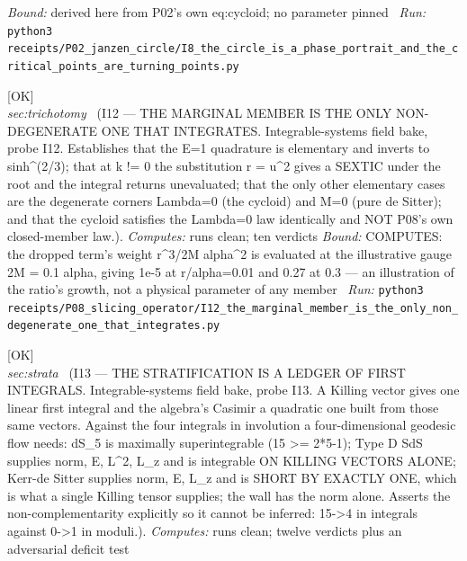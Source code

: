 \begin{description}
 \emph{Bound:} derived here from P02's own eq:cycloid; no parameter pinned
\ \emph{Run:} \texttt{python3 receipts/P02\_janzen\_circle/I8\_the\_circle\_is\_a\_phase\_portrait\_and\_the\_critical\_points\_are\_turning\_points.py}
\item[\label{rcpt:I12_the_marginal_member_is_the_only_non_degenerate_one_that_integrates}\texttt{I12\_the\_marginal\_member\_is\_the\_only\_non\_degenerate\_one\_that\_integrates}]\hfill\textsf{[OK]}\\
\textit{sec:trichotomy} \ (I12 --- THE MARGINAL MEMBER IS THE ONLY NON-DEGENERATE ONE THAT INTEGRATES. Integrable-systems field bake, probe I12. Establishes that the E=1 quadrature is elementary and inverts to sinh\textasciicircum{}(2/3); that at k != 0 the substitution r = u\textasciicircum{}2 gives a SEXTIC under the root and the integral returns unevaluated; that the only other elementary cases are the degenerate corners Lambda=0 (the cycloid) and M=0 (pure de Sitter); and that the cycloid satisfies the Lambda=0 law identically and NOT P08's own closed-member law.). 
\emph{Computes:} runs clean; ten verdicts
 \emph{Bound:} COMPUTES: the dropped term's weight r\textasciicircum{}3/2M alpha\textasciicircum{}2 is evaluated at the illustrative gauge 2M = 0.1 alpha, giving 1e-5 at r/alpha=0.01 and 0.27 at 0.3 --- an illustration of the ratio's growth, not a physical parameter of any member
\ \emph{Run:} \texttt{python3 receipts/P08\_slicing\_operator/I12\_the\_marginal\_member\_is\_the\_only\_non\_degenerate\_one\_that\_integrates.py}
\item[\label{rcpt:I13_the_stratification_is_a_ledger_of_first_integrals}\texttt{I13\_the\_stratification\_is\_a\_ledger\_of\_first\_integrals}]\hfill\textsf{[OK]}\\
\textit{sec:strata} \ (I13 --- THE STRATIFICATION IS A LEDGER OF FIRST INTEGRALS. Integrable-systems field bake, probe I13. A Killing vector gives one linear first integral and the algebra's Casimir a quadratic one built from those same vectors. Against the four integrals in involution a four-dimensional geodesic flow needs: dS\_5 is maximally superintegrable (15 >= 2*5-1); Type D SdS supplies norm, E, L\textasciicircum{}2, L\_z and is integrable ON KILLING VECTORS ALONE; Kerr-de Sitter supplies norm, E, L\_z and is SHORT BY EXACTLY ONE, which is what a single Killing tensor supplies; the wall has the norm alone. Asserts the non-complementarity explicitly so it cannot be inferred: 15->4 in integrals against 0->1 in moduli.). 
\emph{Computes:} runs clean; twelve verdicts plus an adversarial deficit test

\end{description}
